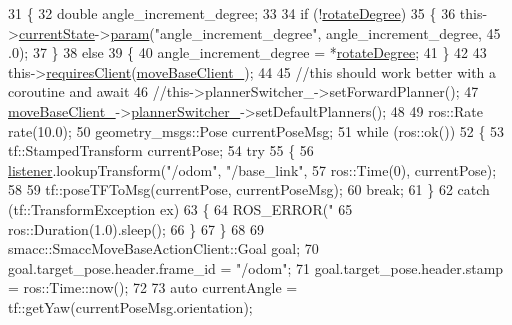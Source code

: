 \begin{DoxyCode}
31     \{
32         \textcolor{keywordtype}{double} angle\_increment\_degree;
33 
34         \textcolor{keywordflow}{if} (!\hyperlink{classsm__dance__bot_1_1SbRotate_a43e1c845c2cd8f5ba2fbcc03abc91d34}{rotateDegree})
35         \{
36             this->\hyperlink{classsmacc_1_1SmaccSubStateBehavior_a62e2b9da4a446f09396d0b4c01659b88}{currentState}->\hyperlink{classsmacc_1_1ISmaccState_a4982f2187ed6da337462721146e8ef70}{param}(\textcolor{stringliteral}{"angle\_increment\_degree"}, angle\_increment\_degree, 45
      .0);
37         \}
38         \textcolor{keywordflow}{else}
39         \{
40             angle\_increment\_degree = *\hyperlink{classsm__dance__bot_1_1SbRotate_a43e1c845c2cd8f5ba2fbcc03abc91d34}{rotateDegree};
41         \}
42 
43         this->\hyperlink{classsmacc_1_1SmaccSubStateBehavior_ae8361a9e794b02f9f3d962b881e4fd7d}{requiresClient}(\hyperlink{classsm__dance__bot_1_1SbRotate_a7b8658c9d207a3b88c97d77f718bd4ad}{moveBaseClient\_});
44 
45         \textcolor{comment}{//this should work better with a coroutine and await}
46         \textcolor{comment}{//this->plannerSwitcher\_->setForwardPlanner();}
47         \hyperlink{classsm__dance__bot_1_1SbRotate_a7b8658c9d207a3b88c97d77f718bd4ad}{moveBaseClient\_}->\hyperlink{classsmacc_1_1SmaccMoveBaseActionClient_ae24164268108abf0b35cf51bfba5ec67}{plannerSwitcher\_}->setDefaultPlanners();
48 
49         ros::Rate rate(10.0);
50         geometry\_msgs::Pose currentPoseMsg;
51         \textcolor{keywordflow}{while} (ros::ok())
52         \{
53             tf::StampedTransform currentPose;
54             \textcolor{keywordflow}{try}
55             \{
56                 \hyperlink{classsm__dance__bot_1_1SbRotate_ab3fcf762bb8d5a5ada2fa3624403ec66}{listener}.lookupTransform(\textcolor{stringliteral}{"/odom"}, \textcolor{stringliteral}{"/base\_link"},
57                                          ros::Time(0), currentPose);
58 
59                 tf::poseTFToMsg(currentPose, currentPoseMsg);
60                 \textcolor{keywordflow}{break};
61             \}
62             \textcolor{keywordflow}{catch} (tf::TransformException ex)
63             \{
64                 ROS\_ERROR(\textcolor{stringliteral}{"%
65                 ros::Duration(1.0).sleep();
66             \}
67         \}
68 
69         smacc::SmaccMoveBaseActionClient::Goal goal;
70         goal.target\_pose.header.frame\_id = \textcolor{stringliteral}{"/odom"};
71         goal.target\_pose.header.stamp = ros::Time::now();
72 
73         \textcolor{keyword}{auto} currentAngle = tf::getYaw(currentPoseMsg.orientation);
}
\end{DoxyCode}
